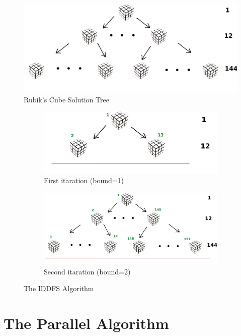 \documentclass[a4paper]{article}
\begin{document}
\begin{figure}[ht]
  \centering
  \includegraphics[width=0.8\linewidth]{rubik_tree}
  \caption{Rubik's Cube Solution Tree}
  \label{fig:tree}
\end{figure}
\FloatBarrier


\begin{figure}
\begin{subfigure}{0.40\textwidth}
\includegraphics[width=\linewidth]{rubik_tree_eval1}
\caption{First itaration (bound=1)} \label{fig:ita}
\end{subfigure}
\hspace*{\fill} %
\begin{subfigure}{0.60\textwidth}
\includegraphics[width=\linewidth]{rubik_tree_eval2}
\caption{Second itaration (bound=2)} \label{fig:itb}
\end{subfigure}
\caption{The IDDFS Algorithm} \label{fig:iterations}
\end{figure}
\FloatBarrier

\section{The Parallel Algorithm}
\label{sec:par_algo}
\end{document}
